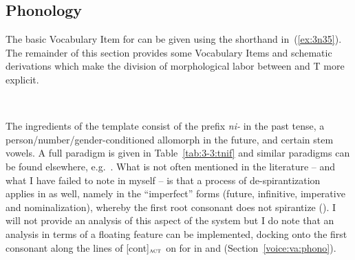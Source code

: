 \begin{exe}
\begin{xlist}
\begin{xlist}
\begin{exe}
\begin{xlist}
\begin{xlist}
\begin{exe}
\begin{xlist}
\begin{xlist}
\begin{exe}
\begin{exe}
\begin{xlist}
\begin{exe}
\begin{exe}
\begin{xlist}
\begin{exe}
\begin{exe}
\begin{exe}
\begin{exe}
\begin{exe}
\begin{xlist}
\begin{exe}
\begin{xlist}
\begin{exe}
\begin{exe}
\begin{xlist}
\begin{exe}
\begin{xlist}
\begin{exe}
\begin{xlist}
\begin{exe}
\begin{exe}
\begin{exe}
\begin{xlist}
\begin{exe}
\begin{exe}
\begin{exe}
\begin{xlist}
\begin{exe}
\begin{xlist}
\begin{exe}
\begin{exe}
\begin{xlist}
\begin{exe}
\begin{exe}
	\subsection{Phonology} \label{vz:vz:phono}
The basic Vocabulary Item for {\vz} can be given using the shorthand in~(\ref{ex:3n35}). The remainder of this section provides some Vocabulary Items and schematic derivations which make the division of morphological labor between {\vz} and T more explicit.
 \begin{exe}
\ex  \label{ex:3n35}{\vz} \lra~{\tnif} 
 \z 

\label{r1:3:3}The ingredients of the template {\tnif} consist of the prefix \emph{ni-} in the past tense, a person/number/gender-conditioned allomorph in the future, and certain stem vowels. A full paradigm is given in Table~\ref{tab:3-3:tnif} and similar paradigms can be found elsewhere, e.g.~\cite{schwarzwald08}. What is not often mentioned in the literature -- and what I have failed to note in \cite{kastner18nllt} myself -- is that a process of de-spirantization applies in {\tnif} as well, namely in the ``imperfect'' forms (future, infinitive, imperative and nominalization), whereby the first root consonant does not spirantize (). I will not provide an analysis of this aspect of the system but I do note that an analysis in terms of a floating feature can be implemented, docking onto the first consonant along the lines of [\textminus{}cont]$_{\text{\gsc{ACT}}}$ on  for {\va} in {\tpie} and {\thit} (Section~\ref{voice:va:phono}).


\end{exe}
\end{exe}
\end{exe}
\end{xlist}
\end{exe}
\end{exe}
\end{xlist}
\end{exe}
\end{xlist}
\end{exe}
\end{exe}
\end{exe}
\end{xlist}
\end{exe}
\end{exe}
\end{exe}
\end{xlist}
\end{exe}
\end{xlist}
\end{exe}
\end{xlist}
\end{exe}
\end{exe}
\end{xlist}
\end{exe}
\end{xlist}
\end{exe}
\end{exe}
\end{exe}
\end{exe}
\end{exe}
\end{xlist}
\end{exe}
\end{exe}
\end{xlist}
\end{exe}
\end{exe}
\end{xlist}
\end{xlist}
\end{exe}
\end{xlist}
\end{xlist}
\end{exe}
\end{xlist}
\end{xlist}
\end{exe}
